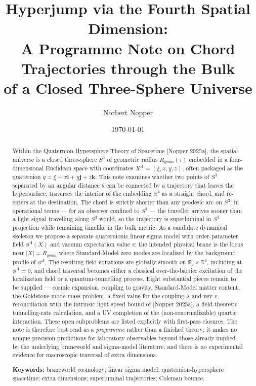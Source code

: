 \documentclass[11pt,a4paper]{article}
\title{Hyperjump via the Fourth Spatial Dimension:\\
A Programme Note on Chord Trajectories through the Bulk\\
of a Closed Three-Sphere Universe}
\author{Norbert Nopper}
\date{\today}
\newcommand{\Rgeom}{R_{\mathrm{geom}}}
\begin{document}
\maketitle

\begin{abstract}
\noindent Within the Quaternion-Hypersphere Theory of Spacetime [Nopper 2025a], the spatial universe is a closed three-sphere $S^3$ of geometric radius $\Rgeom(\tau)$ embedded in a four-dimensional Euclidean space with coordinates $X^A=(\xi,x,y,z)$, often packaged as the quaternion $q=\xi+x\mathbf{i}+y\mathbf{j}+z\mathbf{k}$. This note examines whether two points of $S^3$ separated by an angular distance $\theta$ can be connected by a trajectory that leaves the hypersurface, traverses the interior of the embedding $\mathbb{R}^4$ as a straight chord, and re-enters at the destination. The chord is strictly shorter than any geodesic arc on $S^3$; in operational terms --- for an observer confined to $S^3$ --- the traveller arrives sooner than a light signal travelling along $S^3$ would, so the trajectory is superluminal in $S^3$ projection while remaining timelike in the bulk metric. As a candidate dynamical skeleton we propose a separate quaternionic linear sigma model with order-parameter field $\phi^A(X)$ and vacuum expectation value $v$; the intended physical brane is the locus near $\lvert X\rvert=\Rgeom$ where Standard-Model zero modes are localized by the background profile of $\phi^A$. The resulting field equations are globally smooth on $\mathbb{R}_\tau \times \mathbb{R}^4$, including at $\phi^A=0$, and chord traversal becomes either a classical over-the-barrier excitation of the localization field or a quantum-tunnelling process. Eight substantial pieces remain to be supplied --- cosmic expansion, coupling to gravity, Standard-Model matter content, the Goldstone-mode mass problem, a fixed value for the coupling $\lambda$ and vev $v$, reconciliation with the intrinsic light-speed bound of [Nopper 2025a], a field-theoretic tunnelling-rate calculation, and a UV completion of the (non-renormalizable) quartic interaction. These open subproblems are listed explicitly with first-pass closures. The note is therefore best read as a \emph{programme} rather than a finished theory; it makes no unique precision predictions for laboratory observables beyond those already implied by the underlying braneworld and sigma-model literature, and there is no experimental evidence for macroscopic traversal of extra dimensions.

\medskip
\noindent\textbf{Keywords:} braneworld cosmology; linear sigma model; quaternion-hypersphere spacetime; extra dimensions; superluminal trajectories; Coleman bounce.
\end{abstract}
\end{document}

